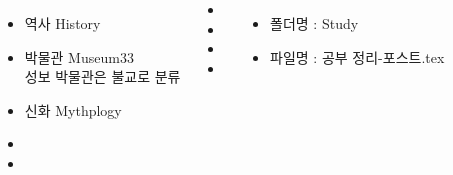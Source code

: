 \documentclass[	20pt, 
							a1paper, 
							landscape,
							margin=0mm, %
							innermargin=10mm,  		%
							blockverticalspace=4mm, %
							colspace=5mm, 
							subcolspace=0mm
							]{tikzposter}
\begin{document}
\begin{columns}

			{
					\begin{itemize}
					\item 	역사    History
					\item 	박물관 Museum33 \\
							성보 박물관은 불교로 분류
					\item 	신화    Mythplogy
					\item 
					\item 
					\end{itemize}
			} %







			{
				\begin{LARGE}
					\begin{itemize}
					\item 
					\item 
					\item 
					\item 
					\end{itemize}
				\end{LARGE}
			} %


			{
					\begin{itemize}
					\item 폴더명 : Study
					\item 파일명 : 공부 정리-포스트.tex
					\end{itemize}
			}






	\end{columns}
\end{document}
